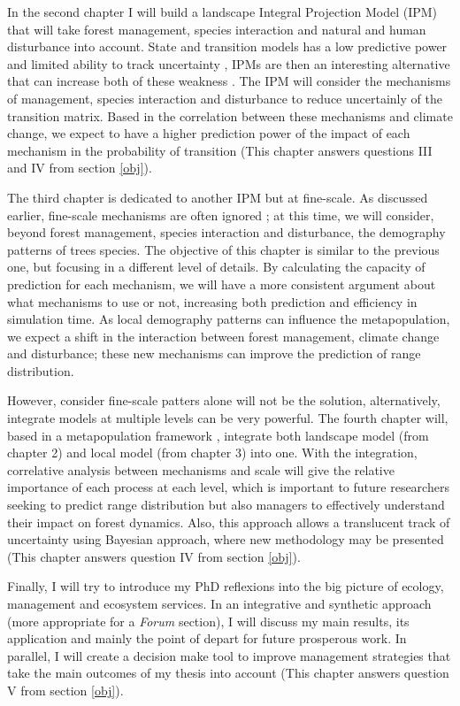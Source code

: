 In the second chapter I will build a landscape Integral Projection Model (IPM) that will take forest management, species interaction and natural and human disturbance into account.
State and transition models has a low predictive power and limited ability to track uncertainty \parencite{Bashari2008,Phillips2011}, IPMs are then an interesting alternative that can increase both of these weakness \parencite{Elderd2016}.
The IPM will consider the mechanisms of management, species interaction and disturbance to reduce uncertainly of the transition matrix.
Based in the correlation between these mechanisms and climate change, we expect to have a higher prediction power of the impact of each mechanism in the probability of transition (This chapter answers questions III and IV from section \ref{obj}).

The third chapter is dedicated to another IPM but at fine-scale.
As discussed earlier, fine-scale mechanisms are often ignored \parencite{Hylander2013}; at this time, we will consider, beyond forest management, species interaction and disturbance, the demography patterns of trees species.
The objective of this chapter is similar to the previous one, but focusing in a different level of details.
By calculating the capacity of prediction for each mechanism, we will have a more consistent argument about what mechanisms to use or not, increasing both prediction and efficiency in simulation time.
As local demography patterns can influence the metapopulation, we expect a shift in the interaction between forest management, climate change and disturbance; these new mechanisms can improve the prediction of range distribution.

However, consider fine-scale patters alone will not be the solution, alternatively, integrate models at multiple levels can be very powerful. The fourth chapter will, based in a metapopulation framework \parencite{Talluto2016a}, integrate both landscape model (from chapter 2) and local model (from chapter 3) into one.
With the integration, correlative analysis between mechanisms and scale will give the relative importance of each process at each level, which is important to future researchers seeking to predict range distribution but also managers to effectively understand their impact on forest dynamics.
Also, this approach allows a translucent track of uncertainty using Bayesian approach, where new methodology may be presented (This chapter answers question IV from section \ref{obj}).

Finally, I will try to introduce my PhD reflexions into the big picture of ecology, management and ecosystem services. In an integrative and synthetic approach (more appropriate for a \textit{Forum} section), I will discuss my main results, its application and mainly the point of depart for future prosperous work.
In parallel, I will create a decision make tool to improve management strategies that take the main outcomes of my thesis into account (This chapter answers question V from section \ref{obj}).

\printbibliography


